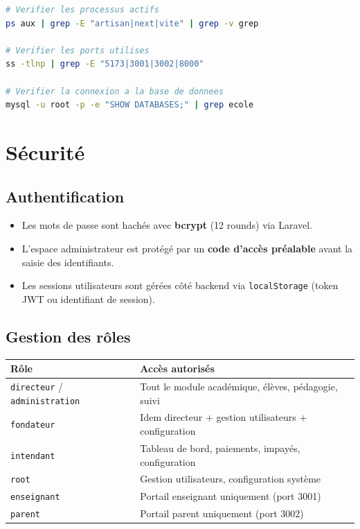 \documentclass[12pt,a4paper]{report}
\begin{document}
\begin{lstlisting}[language=bash]
# Verifier les processus actifs
ps aux | grep -E "artisan|next|vite" | grep -v grep

# Verifier les ports utilises
ss -tlnp | grep -E "5173|3001|3002|8000"

# Verifier la connexion a la base de donnees
mysql -u root -p -e "SHOW DATABASES;" | grep ecole
\end{lstlisting}

\chapter{Sécurité}

\section{Authentification}

\begin{itemize}[leftmargin=*]
  \item Les mots de passe sont hachés avec \textbf{bcrypt} (12 rounds) via Laravel.
  \item L'espace administrateur est protégé par un \textbf{code d'accès préalable} avant la saisie des identifiants.
  \item Les sessions utilisateurs sont gérées côté backend via \texttt{localStorage} (token JWT ou identifiant de session).
\end{itemize}

\section{Gestion des rôles}

\begin{tabularx}{\textwidth}{lX}\toprule
\textbf{Rôle} & \textbf{Accès autorisés} \\\midrule
\texttt{directeur} / \texttt{administration} & Tout le module académique, élèves, pédagogie, suivi \\
\texttt{fondateur} & Idem directeur + gestion utilisateurs + configuration \\
\texttt{intendant} & Tableau de bord, paiements, impayés, configuration \\
\texttt{root} & Gestion utilisateurs, configuration système \\
\texttt{enseignant} & Portail enseignant uniquement (port 3001) \\
\texttt{parent} & Portail parent uniquement (port 3002) \\
\bottomrule\end{tabularx}
\end{document}
